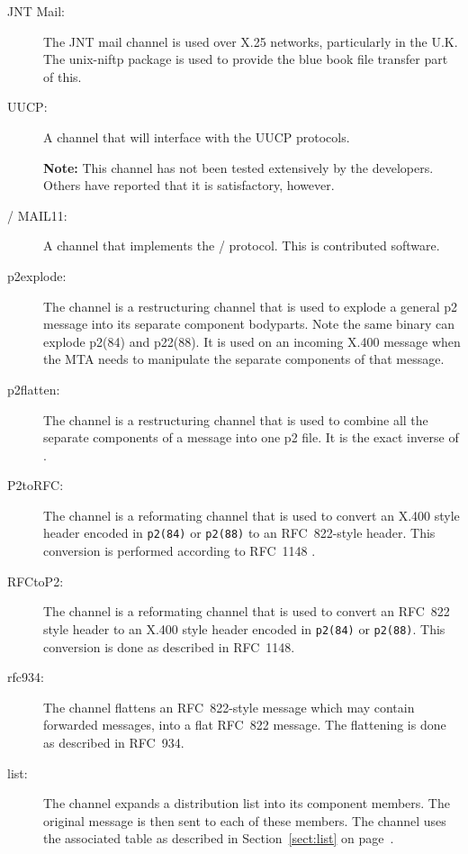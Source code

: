 \begin{description}
\item[JNT Mail:]
The JNT mail channel is used over X.25 networks, particularly in the U.K.
The unix-niftp package is used to provide the blue book file transfer
part of this.

\item[UUCP:]
A channel that will interface with the UUCP protocols.

{\bf Note:} This channel has not been tested extensively by the
developers. Others have reported that it is satisfactory, however.

\item[\decnet/ MAIL11:]
A channel that implements the \decnet/ protocol. This is contributed
software.

\item[p2explode:]
The  channel is a restructuring channel that is used to
explode a general p2 message into its separate component bodyparts.
Note the same binary can explode p2(84) and p22(88).  It is used
on an incoming X.400 message when the MTA needs to manipulate the
separate components of that message.

\item[p2flatten:]
The  channel is a restructuring channel that is used to
combine all the separate components of a message into one p2 file.  It
is the exact inverse of .

\item[P2toRFC:]
The  channel is a reformating channel that is used to
convert an X.400 style header encoded in \verb+p2(84)+ or
\verb+p2(88)+ to an RFC~822-style header.  This conversion is
performed according to RFC~1148\cite{RFC1148} .

\item[RFCtoP2:]
The  channel is a reformating channel that is used to
convert an RFC~822 style header to an X.400 style header encoded in
\verb+p2(84)+ or \verb+p2(88)+.
This conversion is done as described in RFC~1148.

\item[rfc934:]
The  channel flattens an RFC~822-style message which may
contain forwarded messages, into a flat RFC~822 message.  The
flattening is done as described in RFC~934\cite{RFC934}. 

\item[list:]
The  channel expands a distribution list into its component
members. The original message is then sent to each of these members.
The channel uses the associated  table as described in
Section~\ref{sect:list} on page~\pageref{sect:list}. 


\end{description}
